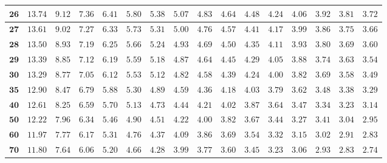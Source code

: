 \begin{customTableWrapper}{1.4}
\begin{longtable}{|r|r|r|r|r|r|r|r|r|r|r|r|r|r|r|r|}
    ${\mathbf{26}}$  & ${13.74}$   & ${9.12}$   & ${7.36}$   & ${6.41}$   & ${5.80}$   & ${5.38}$   & ${5.07}$   & ${4.83}$   & ${4.64}$   & ${4.48}$   & ${4.24}$   & ${4.06}$   & ${3.92}$   & ${3.81}$   & ${3.72}$   \\ \hline 
    ${\mathbf{27}}$  & ${13.61}$   & ${9.02}$   & ${7.27}$   & ${6.33}$   & ${5.73}$   & ${5.31}$   & ${5.00}$   & ${4.76}$   & ${4.57}$   & ${4.41}$   & ${4.17}$   & ${3.99}$   & ${3.86}$   & ${3.75}$   & ${3.66}$   \\ \hline 
    ${\mathbf{28}}$  & ${13.50}$   & ${8.93}$   & ${7.19}$   & ${6.25}$   & ${5.66}$   & ${5.24}$   & ${4.93}$   & ${4.69}$   & ${4.50}$   & ${4.35}$   & ${4.11}$   & ${3.93}$   & ${3.80}$   & ${3.69}$   & ${3.60}$   \\ \hline 
    ${\mathbf{29}}$  & ${13.39}$   & ${8.85}$   & ${7.12}$   & ${6.19}$   & ${5.59}$   & ${5.18}$   & ${4.87}$   & ${4.64}$   & ${4.45}$   & ${4.29}$   & ${4.05}$   & ${3.88}$   & ${3.74}$   & ${3.63}$   & ${3.54}$   \\ \hline 
    ${\mathbf{30}}$  & ${13.29}$   & ${8.77}$   & ${7.05}$   & ${6.12}$   & ${5.53}$   & ${5.12}$   & ${4.82}$   & ${4.58}$   & ${4.39}$   & ${4.24}$   & ${4.00}$   & ${3.82}$   & ${3.69}$   & ${3.58}$   & ${3.49}$   \\ \hline 
    ${\mathbf{35}}$  & ${12.90}$   & ${8.47}$   & ${6.79}$   & ${5.88}$   & ${5.30}$   & ${4.89}$   & ${4.59}$   & ${4.36}$   & ${4.18}$   & ${4.03}$   & ${3.79}$   & ${3.62}$   & ${3.48}$   & ${3.38}$   & ${3.29}$   \\ \hline 
    ${\mathbf{40}}$  & ${12.61}$   & ${8.25}$   & ${6.59}$   & ${5.70}$   & ${5.13}$   & ${4.73}$   & ${4.44}$   & ${4.21}$   & ${4.02}$   & ${3.87}$   & ${3.64}$   & ${3.47}$   & ${3.34}$   & ${3.23}$   & ${3.14}$   \\ \hline 
    ${\mathbf{50}}$  & ${12.22}$   & ${7.96}$   & ${6.34}$   & ${5.46}$   & ${4.90}$   & ${4.51}$   & ${4.22}$   & ${4.00}$   & ${3.82}$   & ${3.67}$   & ${3.44}$   & ${3.27}$   & ${3.41}$   & ${3.04}$   & ${2.95}$   \\ \hline 
    ${\mathbf{60}}$  & ${11.97}$   & ${7.77}$   & ${6.17}$   & ${5.31}$   & ${4.76}$   & ${4.37}$   & ${4.09}$   & ${3.86}$   & ${3.69}$   & ${3.54}$   & ${3.32}$   & ${3.15}$   & ${3.02}$   & ${2.91}$   & ${2.83}$   \\ \hline 
    ${\mathbf{70}}$  & ${11.80}$   & ${7.64}$   & ${6.06}$   & ${5.20}$   & ${4.66}$   & ${4.28}$   & ${3.99}$   & ${3.77}$   & ${3.60}$   & ${3.45}$   & ${3.23}$   & ${3.06}$   & ${2.93}$   & ${2.83}$   & ${2.74}$   \\ \hline 

\end{longtable}
\end{customTableWrapper}
